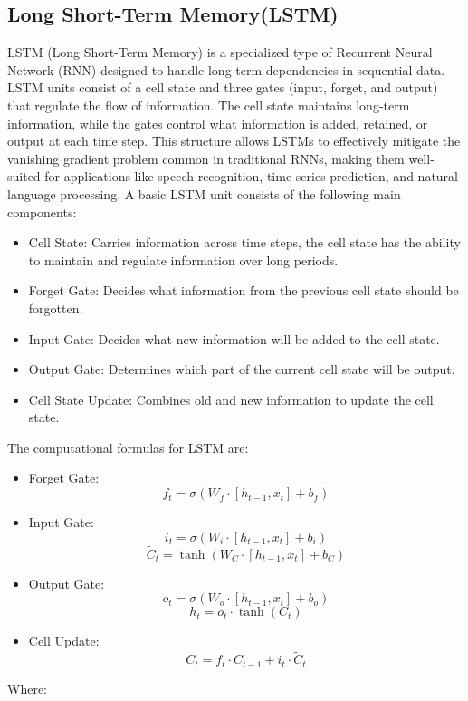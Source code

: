 \documentclass{ieeeojies}
\begin{document}
\subsection{Long Short-Term Memory(LSTM)}
LSTM (Long Short-Term Memory) is a specialized type of Recurrent Neural Network (RNN) designed to handle long-term dependencies in sequential data. LSTM units consist of a cell state and three gates (input, forget, and output) that regulate the flow of information. The cell state maintains long-term information, while the gates control what information is added, retained, or output at each time step. This structure allows LSTMs to effectively mitigate the vanishing gradient problem common in traditional RNNs, making them well-suited for applications like speech recognition, time series prediction, and natural language processing. A basic LSTM unit consists of the following main components:
\begin{itemize}
  \item Cell State: Carries information across time steps, the cell state has the ability to maintain and regulate information over long periods.
  \item Forget Gate: Decides what information from the previous cell state should be forgotten.
  \item Input Gate: Decides what new information will be added to the cell state.
  \item Output Gate: Determines which part of the current cell state will be output.
  \item Cell State Update: Combines old and new information to update the cell state.
\end{itemize}
The computational formulas for LSTM are:
\begin{itemize}
  \item Forget Gate: \[f_t = \sigma(W_f \cdot [h_{t-1}, x_t] + b_f)\]
  \item Input Gate: \[i_t = \sigma(W_i \cdot [h_{t-1}, x_t] + b_i)\]
        \[\tilde{C}_t = \tanh(W_C \cdot [h_{t-1}, x_t] + b_C)\]
  \item Output Gate: \[o_t = \sigma(W_o \cdot [h_{t-1}, x_t] + b_o)\]
        \[h_t = o_t \cdot \tanh(C_t)\]
  \item Cell Update: \[C_t = f_t \cdot C_{t-1} + i_t \cdot \tilde{C}_t\]
\end{itemize}
Where:
\end{document}
